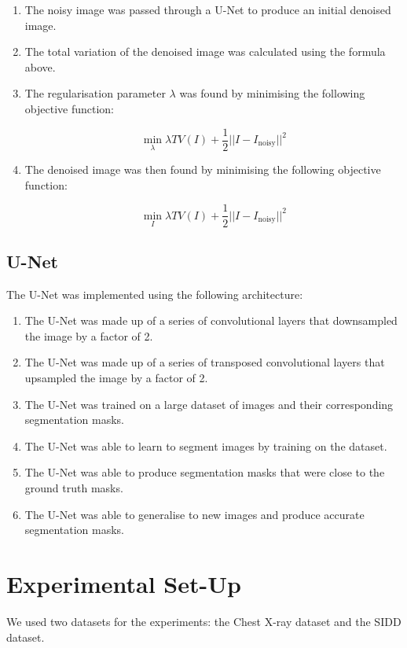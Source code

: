 \documentclass[12pt]{article}
\begin{document}
\begin{enumerate}
    \item The noisy image was passed through a U-Net to produce an initial denoised image.
    \item The total variation of the denoised image was calculated using the formula above.
    \item The regularisation parameter $\lambda$ was found by minimising the following objective function:
    
    \[
    \min_{\lambda} \lambda TV(I) + \frac{1}{2} ||I - I_{\text{noisy}}||^2
    \]
    
    \item The denoised image was then found by minimising the following objective function:
    
    \[
    \min_{I} \lambda TV(I) + \frac{1}{2} ||I - I_{\text{noisy}}||^2
    \]
\end{enumerate}

\subsection{U-Net}

The U-Net was implemented using the following architecture:

\begin{enumerate}
    \item The U-Net was made up of a series of convolutional layers that downsampled the image by a factor of 2.
    \item The U-Net was made up of a series of transposed convolutional layers that upsampled the image by a factor of 2.
    \item The U-Net was trained on a large dataset of images and their corresponding segmentation masks.
    \item The U-Net was able to learn to segment images by training on the dataset.
    \item The U-Net was able to produce segmentation masks that were close to the ground truth masks.
    \item The U-Net was able to generalise to new images and produce accurate segmentation masks.
\end{enumerate}

\section{Experimental Set-Up}

We used two datasets for the experiments: the Chest X-ray dataset and the SIDD dataset.
\end{document}
